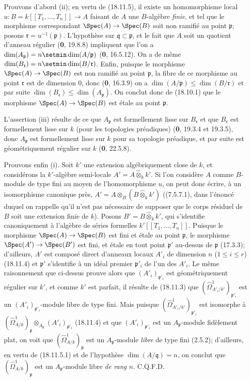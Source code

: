 Prouvons d'abord (ii); en vertu de (18.11.5), il existe un homomorphisme local
$u:B=k[[T_1,\ldots,T_n]]\to A$
faisant de $A$ une $B$-algèbre \emph{finie}, et tel que le morphisme correspondant $\Spec(A)\to\Spec(B)$ soit non ramifié au point $\mathfrak p$; posons $\mathfrak r=u^{-1}(\mathfrak p)$. L'hypothèse sur $\mathfrak q\subset\mathfrak p$, et le fait que $A$ soit un quotient d'anneau régulier (\textbf{0}, 19.8.8) impliquent que l'on a $\dim(A_{\mathfrak p})=n\setmin\dim(A/\mathfrak p)$ (\textbf{0}, 16.5.12). On a de même $\dim(B_{\mathfrak r})=n\setmin\dim(B/\mathfrak r)$. Enfin, puisque le morphisme $\Spec(A)\to\Spec(B)$ est non ramifié au point $\mathfrak p$, la fibre de ce morphisme au point $\mathfrak r$ est de dimension 0, donc (\textbf{0}, 16.3.9) on a $\dim(A/\mathfrak p)\leq\dim(B/\mathfrak r)$ et par suite $\dim(B_{\mathfrak r})\leq\dim(A_{\mathfrak p})$. On conclut donc de (18.10.1) que le morphisme $\Spec(A)\to\Spec(B)$ est étale au point $\mathfrak p$.

L'assertion (iii) résulte de ce que $A_{\mathfrak p}$ est formellement lisse sur $B_{\mathfrak r}$ et que $B_{\mathfrak r}$ est formellement lisse sur $k$ (pour les topologies préadiques) (\textbf{0}, 19.3.4 et 19.3.5), donc $A_{\mathfrak p}$ est formellement lisse sur $k$ pour sa topologie préadique, et par suite est géométriquement régulier sur $k$ (\textbf{0}, 22.5.8).

Prouvons enfin (i). Soit $k'$ une extension algébriquement close de $k$, et considérons la $k'$-algèbre semi-locale $A'=A\widehat{\otimes}_k k'$. Si l'on considère $A$ comme $B$-module de type fini au moyen de l'homomorphisme $u$, on peut donc écrire, à un isomorphisme canonique près, $A'=A\otimes_B(B\widehat{\otimes}_k k')$ ((7.5.7.1), dans l'énoncé duquel on rappelle qu'il n'est pas nécessaire de supposer que le corps résiduel de $B$ soit une extension finie de $k$). Posons $B'=B\widehat{\otimes}_k k'$, qui s'identifie canoniquement à l'algèbre de séries formelles $k'[[T_1,\ldots,T_n]]$. Puisque le morphisme $\Spec(A)\to\Spec(B)$ est fini et étale au point $\mathfrak p$, le morphisme $\Spec(A')\to\Spec(B')$ est fini, et étale en tout point $\mathfrak p'$ au-dessus de $\mathfrak p$ (17.3.3); d'ailleurs, $A'$ est composé direct d'anneaux locaux $A'_i$ de dimension $n$ ($1\leq i\leq r$) (18.11.4) et $\mathfrak p'$ s'identifie à un idéal premier $\mathfrak p'_i$ de l'un des $A'_i$. Le même raisonnement que ci-dessus prouve alors que $(A'_i)_{\mathfrak p'_i}$ est géométriquement régulier sur $k'$, et comme $k'$ est parfait, il résulte de (18.11.3) que $(\hat{\Omega}^1_{A'_i/k'})_{\mathfrak p'_i}$ est un $(A'_i)_{\mathfrak p'_i}$-module libre de type fini. Mais puisque $(\hat{\Omega}^1_{A'_i/k'})_{\mathfrak p'_i}$ est isomorphe à $(\hat{\Omega}^1_{A/k})_{\mathfrak p}\otimes_{A_{\mathfrak p}}(A'_i)_{\mathfrak p'_i}$ (18.11.4) et que $(A'_i)_{\mathfrak p'_i}$ est un $A_{\mathfrak p}$-module fidèlement plat, on voit que $(\hat{\Omega}^1_{A/k})_{\mathfrak p}$ est un $A_{\mathfrak p}$-module \emph{libre} de type fini (2.5.2);
d'ailleurs, en vertu de (18.11.5.1) et de l'hypothèse $\dim(A/\mathfrak q)=n$, on conclut que $(\hat{\Omega}^1_{A/k})_{\mathfrak p}$ est un $A_{\mathfrak p}$-module libre \emph{de rang $n$}. C.Q.F.D.

